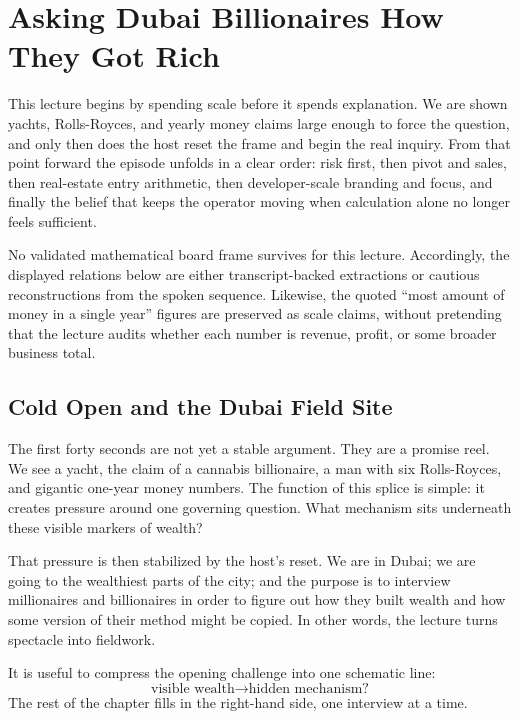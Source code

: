 \chapter{Asking Dubai Billionaires How They Got Rich}

This lecture begins by spending scale before it spends explanation. We are shown yachts, Rolls-Royces, and yearly money claims large enough to force the question, and only then does the host reset the frame and begin the real inquiry. From that point forward the episode unfolds in a clear order: risk first, then pivot and sales, then real-estate entry arithmetic, then developer-scale branding and focus, and finally the belief that keeps the operator moving when calculation alone no longer feels sufficient.

\begin{remark}
No validated mathematical board frame survives for this lecture. Accordingly, the displayed relations below are either transcript-backed extractions or cautious reconstructions from the spoken sequence. Likewise, the quoted ``most amount of money in a single year'' figures are preserved as scale claims, without pretending that the lecture audits whether each number is revenue, profit, or some broader business total.
\end{remark}

\section{Cold Open and the Dubai Field Site}

The first forty seconds are not yet a stable argument. They are a promise reel. We see a yacht, the claim of a cannabis billionaire, a man with six Rolls-Royces, and gigantic one-year money numbers. The function of this splice is simple: it creates pressure around one governing question. What mechanism sits underneath these visible markers of wealth?

That pressure is then stabilized by the host's reset. We are in Dubai; we are going to the wealthiest parts of the city; and the purpose is to interview millionaires and billionaires in order to figure out how they built wealth and how some version of their method might be copied. In other words, the lecture turns spectacle into fieldwork.

It is useful to compress the opening challenge into one schematic line:
\begin{equation}
\text{visible wealth} \to \text{hidden mechanism?}
\end{equation}
The rest of the chapter fills in the right-hand side, one interview at a time.

